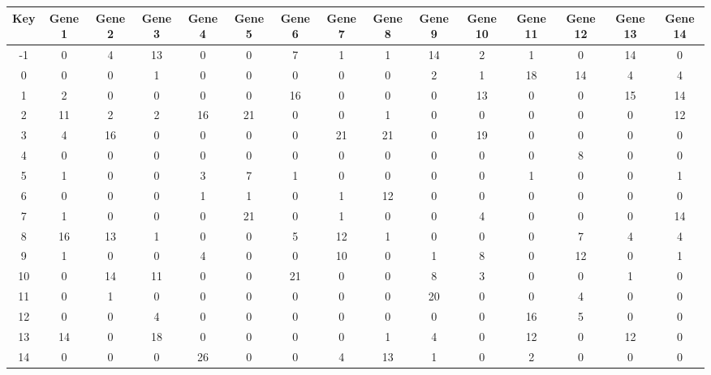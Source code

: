 \begin{tabular}{|c|c|c|c|c|c|c|c|c|c|c|c|c|c|c|}
\hline
Key & Gene 1 & Gene 2 & Gene 3 & Gene 4 & Gene 5 & Gene 6 & Gene 7 & Gene 8 & Gene 9 & Gene 10 & Gene 11 & Gene 12 & Gene 13 & Gene 14 \\
\hline
-1 & 0 & 4 & 13 & 0 & 0 & 7 & 1 & 1 & 14 & 2 & 1 & 0 & 14 & 0 \\
0 & 0 & 0 & 1 & 0 & 0 & 0 & 0 & 0 & 2 & 1 & 18 & 14 & 4 & 4 \\
1 & 2 & 0 & 0 & 0 & 0 & 16 & 0 & 0 & 0 & 13 & 0 & 0 & 15 & 14 \\
2 & 11 & 2 & 2 & 16 & 21 & 0 & 0 & 1 & 0 & 0 & 0 & 0 & 0 & 12 \\
3 & 4 & 16 & 0 & 0 & 0 & 0 & 21 & 21 & 0 & 19 & 0 & 0 & 0 & 0 \\
4 & 0 & 0 & 0 & 0 & 0 & 0 & 0 & 0 & 0 & 0 & 0 & 8 & 0 & 0 \\
5 & 1 & 0 & 0 & 3 & 7 & 1 & 0 & 0 & 0 & 0 & 1 & 0 & 0 & 1 \\
6 & 0 & 0 & 0 & 1 & 1 & 0 & 1 & 12 & 0 & 0 & 0 & 0 & 0 & 0 \\
7 & 1 & 0 & 0 & 0 & 21 & 0 & 1 & 0 & 0 & 4 & 0 & 0 & 0 & 14 \\
8 & 16 & 13 & 1 & 0 & 0 & 5 & 12 & 1 & 0 & 0 & 0 & 7 & 4 & 4 \\
9 & 1 & 0 & 0 & 4 & 0 & 0 & 10 & 0 & 1 & 8 & 0 & 12 & 0 & 1 \\
10 & 0 & 14 & 11 & 0 & 0 & 21 & 0 & 0 & 8 & 3 & 0 & 0 & 1 & 0 \\
11 & 0 & 1 & 0 & 0 & 0 & 0 & 0 & 0 & 20 & 0 & 0 & 4 & 0 & 0 \\
12 & 0 & 0 & 4 & 0 & 0 & 0 & 0 & 0 & 0 & 0 & 16 & 5 & 0 & 0 \\
13 & 14 & 0 & 18 & 0 & 0 & 0 & 0 & 1 & 4 & 0 & 12 & 0 & 12 & 0 \\
14 & 0 & 0 & 0 & 26 & 0 & 0 & 4 & 13 & 1 & 0 & 2 & 0 & 0 & 0 \\
\hline
\end{tabular}
